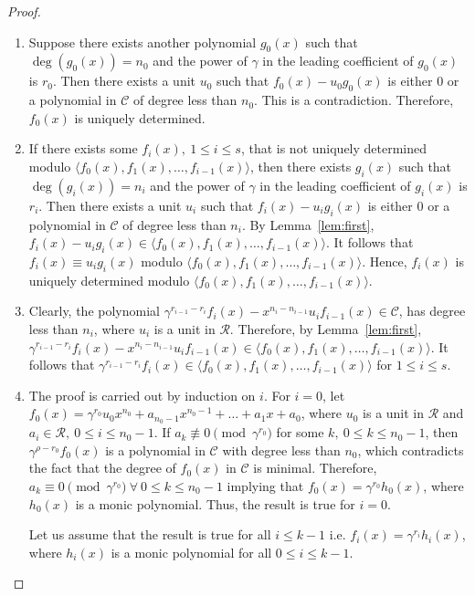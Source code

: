 \documentclass[12pt,a4paper]{article}
\begin{document}
\begin{proof}
    \begin{enumerate}
        \item Suppose there exists another polynomial $g_0(x)$ such that $\deg(g_0(x))=n_0$ and the power of $\gamma$ in the leading coefficient of $g_0(x)$ is $r_0$. Then there exists a unit $u_0$ such that $f_0(x)-u_0g_0(x)$ is either $0$ or a polynomial in $\mathcal{C}$ of degree less than $n_0$. This is a contradiction. Therefore, $f_0(x)$ is uniquely determined.
        \item If there exists some $f_i(x),~1 \le i \le s$, that is not uniquely determined modulo $\langle f_0(x),f_1(x), \dots , f_{i-1}(x) \rangle$, then there exists $g_i(x)$ such that $\deg(g_i(x))=n_i$ and the power of $\gamma$ in the leading coefficient of $g_i(x)$ is $r_i$. Then there exists a unit $u_i$ such that $f_i(x)-u_ig_i(x)$ is either $0$ or a polynomial in $\mathcal{C}$ of degree less than $n_i$. By Lemma~\ref{lem:first}, $f_i(x)-u_ig_i(x) \in \langle f_0(x),f_1(x), \dots, f_{i-1}(x) \rangle$. It follows that $f_i(x)\equiv u_ig_i(x)$ modulo $\langle f_0(x),f_1(x), \dots, f_{i-1}(x) \rangle$. Hence, $f_i(x)$ is uniquely determined modulo $\langle f_0(x),f_1(x), \dots, f_{i-1}(x) \rangle$.
        \item Clearly, the polynomial $\gamma^{r_{i-1}-r_i}f_i(x)-x^{n_i-n_{i-1}}u_if_{i-1}(x) \in \mathcal{C}$, has degree less than $n_i$, where $u_i$ is a unit in $\mathcal{R}$. Therefore, by Lemma~\ref{lem:first}, $\gamma^{r_{i-1}-r_i}f_i(x)-x^{n_i-n_{i-1}}u_if_{i-1}(x) \in \langle f_0(x),f_1(x), \dots, f_{i-1}(x) \rangle$. It follows that $\gamma^{r_{i-1}-r_i}f_i(x) \in \langle f_0(x), f_1(x), \dots, f_{i-1}(x) \rangle$ for $1 \le i \le s$.
        \item The proof is carried out by induction on $i$. For $i=0$, let $f_0(x)= \gamma^{r_0}u_0x^{n_0}+ a_{n_0-1}x^{n_0-1}+ \dots+a_1x+a_0$, where $u_0$ is a unit in $\mathcal{R}$ and $a_i \in \mathcal{R},~ 0 \le i \le n_0-1$. If $a_k \not\equiv 0 \pmod{\gamma^{r_0}}$ for some $k, ~0 \le k \le n_0-1$, then $\gamma^{\rho-r_0}f_0(x)$ is a polynomial in $\mathcal{C}$ with degree less than $n_0$, which contradicts the fact that the degree of $f_0(x)$ in $\mathcal{C}$ is minimal. Therefore, $a_k \equiv 0 \pmod{\gamma^{r_0}}~ \forall~ 0 \le k \le n_0-1$ implying that $f_0(x)=\gamma^{r_0}h_0(x)$, where $h_0(x)$ is a monic polynomial. Thus, the result is true for $i=0$.

        Let us assume that the result is true for all $i \le k-1$ i.e. $f_i(x)=\gamma^{r_i}h_i(x)$, where $h_i(x)$ is a monic polynomial for all $0 \le i \le k-1$.


\end{enumerate}
\end{proof}
\end{document}

